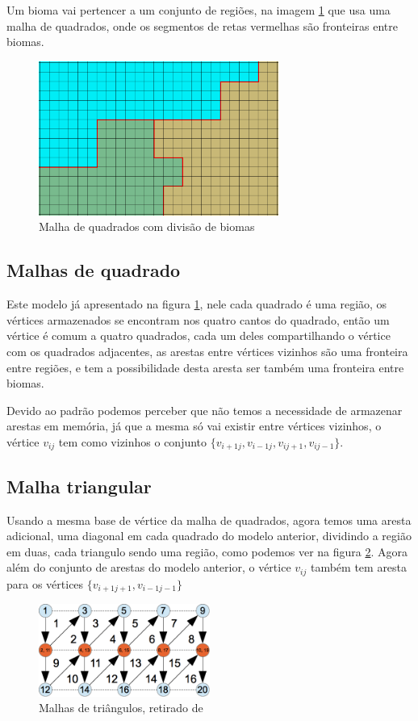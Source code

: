 Um bioma vai pertencer a um conjunto de regiões, na imagem \ref{fig:squadStripBiomes}
que usa uma malha de quadrados, onde os segmentos de retas vermelhas são fronteiras entre
biomas.
\begin{figure}[H]
    \centering
    \includegraphics[width=0.7\textwidth]{figuras/squadStripBiomes.png}
    \caption{Malha de quadrados com divisão de biomas}
    \label{fig:squadStripBiomes}
\end{figure}
\subsection{Malhas de quadrado}
Este modelo já apresentado na figura \ref{fig:squadStripBiomes}, nele cada
quadrado é uma região, os vértices armazenados se encontram nos quatro cantos
do quadrado, então um vértice é comum a quatro quadrados, cada um deles
compartilhando o vértice com os quadrados adjacentes, as arestas entre vértices
vizinhos são uma fronteira entre regiões, e tem a possibilidade desta aresta ser
também uma fronteira entre biomas.

Devido ao padrão podemos perceber que não temos a necessidade de armazenar arestas
em memória, já que a mesma só vai existir entre vértices vizinhos, o vértice
$v_{i j}$ tem como vizinhos o conjunto $\{v_{i+1 j}, v_{i-1 j}, v_{i j+1}, v_{i j-1}\}$.
\subsection{Malha triangular}
Usando a mesma base de vértice da malha de quadrados, agora temos uma aresta
adicional, uma diagonal em cada quadrado do modelo anterior, dividindo a região
em duas, cada triangulo sendo uma região, como podemos ver na figura \ref{fig:vbo}.
Agora além do conjunto de arestas do modelo anterior, o vértice $v_{i j}$ também tem
aresta para os vértices $\{v_{i+1 j+1}, v_{i-1 j-1}\}$
\begin{figure}[H]
    \centering
    \includegraphics[width=0.5\textwidth]{figuras/vbo.png}
    \caption{Malhas de triângulos, retirado de \cite{androidtrianglestrip}}
    \label{fig:vbo}
\end{figure}


